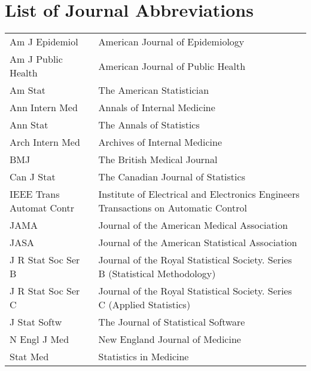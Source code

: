 \chapter*{List of Journal Abbreviations}
\begin{center}
\begin{longtable}{lp{}}
  Am J Epidemiol \dotfill & American Journal of Epidemiology \\
  Am J Public Health \dotfill & American Journal of Public Health \\
  Am Stat \dotfill & The American Statistician \\
  Ann Intern Med \dotfill & Annals of Internal Medicine \\
  Ann Stat \dotfill & The Annals of Statistics \\
  Arch Intern Med \dotfill & Archives of Internal Medicine \\
  BMJ \dotfill & The British Medical Journal \\
  Can J Stat \dotfill & The Canadian Journal of Statistics \\
  IEEE Trans Automat Contr \dotfill & Institute of Electrical and Electronics Engineers Transactions on Automatic Control \\
  JAMA \dotfill & Journal of the American Medical Association \\
  JASA \dotfill & Journal of the American Statistical Association \\
  J R Stat Soc Ser B \dotfill & Journal of the Royal Statistical Society. Series B (Statistical Methodology) \\
  J R Stat Soc Ser C \dotfill & Journal of the Royal Statistical Society. Series C (Applied Statistics) \\
  J Stat Softw \dotfill & The Journal of Statistical Software \\
  N Engl J Med \dotfill & New England Journal of Medicine \\
  Stat Med \dotfill & Statistics in Medicine 
\end{longtable}
\end{center}
